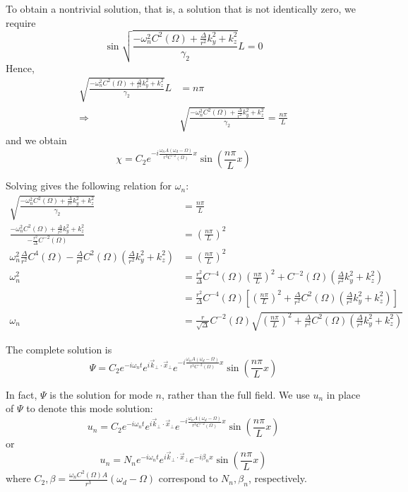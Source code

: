 \documentclass[english]{article}
\begin{document}
 To obtain a nontrivial solution, that is, a solution that is not
identically zero, we require 
\[
\sin\sqrt{\frac{-\omega^{2}_{n}C^{2}\left(\Omega\right)+\frac{\Delta}{r^{2}}k^{2}_{y}+k^{2}_{z}}{\gamma_{2}}}L=0
\]
 Hence, 
\begin{align*}
\sqrt{\frac{-\omega^{2}_{n}C^{2}\left(\Omega\right)+\frac{\Delta}{r^{2}}k^{2}_{y}+k^{2}_{z}}{\gamma_{2}}}L & =n\pi\\
\Rightarrow & \sqrt{\frac{-\omega^{2}_{n}C^{2}\left(\Omega\right)+\frac{\Delta}{r^{2}}k^{2}_{y}+k^{2}_{z}}{\gamma_{2}}}=\frac{n\pi}{L}
\end{align*}
 and we obtain 
\[
\chi=C_{2}e^{-i\frac{\omega_{n}A\left(\omega_{d}-\Omega\right)}{r^{3}C^{-2}\left(\Omega\right)}x}\sin\left(\frac{n\pi}{L}x\right)
\]

Solving gives the following relation for $\omega_{n}$: 
\begin{align*}
\sqrt{\frac{-\omega^{2}_{n}C^{2}\left(\Omega\right)+\frac{\Delta}{r^{2}}k^{2}_{y}+k^{2}_{z}}{\gamma_{2}}} & =\frac{n\pi}{L}\\
\frac{-\omega^{2}_{n}C^{2}\left(\Omega\right)+\frac{\Delta}{r^{2}}k^{2}_{y}+k^{2}_{z}}{-\frac{r^{2}}{\Delta}C^{-2}\left(\Omega\right)} & =\left(\frac{n\pi}{L}\right)^{2}\\
\omega^{2}_{n}\frac{\Delta}{r^{2}}C^{4}\left(\Omega\right)-\frac{\Delta}{r^{2}}C^{2}\left(\Omega\right)\left(\frac{\Delta}{r^{2}}k^{2}_{y}+k^{2}_{z}\right) & =\left(\frac{n\pi}{L}\right)^{2}\\
\omega^{2}_{n} & =\frac{r^{2}}{\Delta}C^{-4}\left(\Omega\right)\left(\frac{n\pi}{L}\right)^{2}+C^{-2}\left(\Omega\right)\left(\frac{\Delta}{r^{2}}k^{2}_{y}+k^{2}_{z}\right)\\
 & =\frac{r^{2}}{\Delta}C^{-4}\left(\Omega\right)\left[\left(\frac{n\pi}{L}\right)^{2}+\frac{\Delta}{r^{2}}C^{2}\left(\Omega\right)\left(\frac{\Delta}{r^{2}}k^{2}_{y}+k^{2}_{z}\right)\right]\\
\omega_{n} & =\frac{r}{\sqrt{\Delta}}C^{-2}\left(\Omega\right)\sqrt{\left(\frac{n\pi}{L}\right)^{2}+\frac{\Delta}{r^{2}}C^{2}\left(\Omega\right)\left(\frac{\Delta}{r^{2}}k^{2}_{y}+k^{2}_{z}\right)}
\end{align*}

The complete solution is 
\[
\Psi=C_{2}e^{-i\omega_{n}t}e^{i\vec{k}_{\bot}\cdot\vec{x}_{\bot}}e^{-i\frac{\omega_{n}A\left(\omega_{d}-\Omega\right)}{r^{3}C^{-2}\left(\Omega\right)}x}\sin\left(\frac{n\pi}{L}x\right)
\]

In fact, $\Psi$ is the solution for mode $n$, rather than the full
field. We use $u_{n}$ in place of $\Psi$ to denote this mode solution:
\[
u_{n}=C_{2}e^{-i\omega_{n}t}e^{i\vec{k}_{\bot}\cdot\vec{x}_{\bot}}e^{-i\frac{\omega_{n}A\left(\omega_{d}-\Omega\right)}{r^{3}C^{-2}\left(\Omega\right)}x}\sin\left(\frac{n\pi}{L}x\right)
\]
 or 
\[
u_{n}=N_{n}e^{-i\omega_{n}t}e^{i\vec{k}_{\bot}\cdot\vec{x}_{\bot}}e^{-i\beta_{n}x}\sin\left(\frac{n\pi}{L}x\right)
\]
 where $C_{2},\beta=\frac{\omega_{n}C^{2}\left(\Omega\right)A}{r^{3}}\left(\omega_{d}-\Omega\right)$
correspond to $N_{n},\beta_{n}$, respectively.
\end{document}
